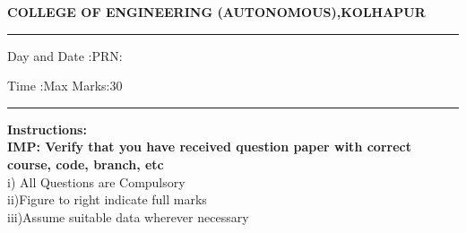 \documentclass[12pt]{article}
\begin{document}
	\par
	{\bf{COLLEGE OF ENGINEERING (AUTONOMOUS),KOLHAPUR}}
	\par\noindent\rule{\textwidth}{0.4pt}
	
	\par
	\par
	\par
	\begin{flushleft}
		Day and Date :{}\hspace{5.5cm}PRN:
	\end{flushleft}
	
	\begin{flushleft}
		Time :{}\hspace{7cm}Max Marks:{30}\\
	\end{flushleft}
	\noindent\rule{\textwidth}{0.1pt}
\begin{flushleft}
	{\bf Instructions:}\\
	{\hspace{0.5cm} \bf IMP: Verify that you have received question paper with correct course, code, branch, etc}\\
	\hspace{1cm}i) All Questions are Compulsory\\
	\hspace{1cm}ii)Figure to right indicate full marks\\
	\hspace{1cm}iii)Assume suitable data wherever necessary\\
\end{flushleft}
\end{document}
